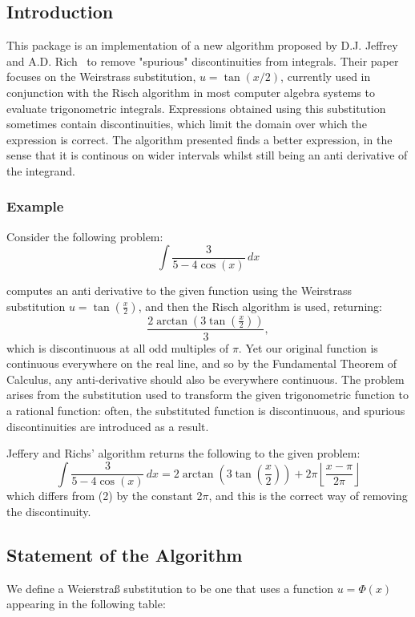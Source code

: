   

\subsection{Introduction}
This package is an implementation of a new algorithm proposed by D.J. Jeffrey and A.D. Rich~\cite{JeffreyRich:94} to remove "spurious" discontinuities from integrals. Their paper focuses on the Weirstrass substitution, $u=\tan(x/2)$, currently used in conjunction with the Risch algorithm in most computer algebra systems to evaluate trigonometric integrals. Expressions obtained using this substitution sometimes contain discontinuities, which limit the domain over which the expression is correct. The algorithm presented finds a better expression, in the sense that it is continous on wider intervals whilst still being an anti derivative of the integrand.

\subsubsection{Example}
 Consider the following problem:
     \[ \int \frac{3}{5-4\cos(x)}\,dx  \]

\REDUCE computes an anti derivative to the given function using the Weirstrass substitution $u=\tan(\frac{x}{2})$, and then the Risch algorithm is used, returning:
    \[ \frac{2\arctan(3\tan(\frac{x}{2}))}{3}, \]
which is discontinuous at all odd multiples of $\pi$. Yet our original function is continuous everywhere on the real line, and so by the Fundamental Theorem of Calculus, any anti-derivative should also be everywhere continuous. The problem arises from the substitution used to transform the given trigonometric function to a rational function: often, the substituted function is discontinuous, and spurious discontinuities are introduced as a result.

Jeffery and Richs' algorithm returns the following to the given problem:
\[ \int \frac{3}{5-4\cos(x)}\,dx = 2\arctan\left(3\tan\left(\frac{x}{2}\right)\right)+2\pi\left\lfloor \frac{x-\pi}{2\pi} \right\rfloor \]
which differs from (2) by the constant 2$\pi$, and this is the correct way of removing the discontinuity.

\subsection{Statement of the Algorithm}
We define a Weierstra\ss{} substitution to be one that uses a function $u=\Phi(x)$ appearing in the following table:

